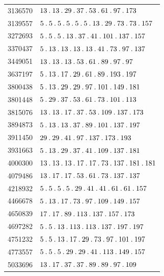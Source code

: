 \begin{longtable}{@{}r|l@{}}
3136570 & $13\pdot 13\pdot 29\pdot 37\pdot 53\pdot 61\pdot 97\pdot 173$\\
3139557 & $5\pdot 5\pdot 5\pdot 5\pdot 5\pdot 5\pdot 13\pdot 29\pdot 73\pdot 73\pdot 157$\\
3272693 & $5\pdot 5\pdot 5\pdot 13\pdot 37\pdot 41\pdot 101\pdot 137\pdot 157$\\
3370437 & $5\pdot 13\pdot 13\pdot 13\pdot 13\pdot 41\pdot 73\pdot 97\pdot 137$\\
3449051 & $13\pdot 13\pdot 13\pdot 53\pdot 61\pdot 89\pdot 97\pdot 97$\\
3637197 & $5\pdot 13\pdot 17\pdot 29\pdot 61\pdot 89\pdot 193\pdot 197$\\
3800438 & $5\pdot 13\pdot 29\pdot 29\pdot 97\pdot 101\pdot 149\pdot 181$\\
3801448 & $5\pdot 29\pdot 37\pdot 53\pdot 61\pdot 73\pdot 101\pdot 113$\\
3815076 & $13\pdot 13\pdot 17\pdot 37\pdot 53\pdot 109\pdot 137\pdot 173$\\
3894873 & $5\pdot 13\pdot 13\pdot 37\pdot 89\pdot 101\pdot 137\pdot 197$\\
3911450 & $29\pdot 29\pdot 41\pdot 97\pdot 137\pdot 173\pdot 193$\\
3931663 & $5\pdot 13\pdot 29\pdot 37\pdot 41\pdot 109\pdot 137\pdot 181$\\
4000300 & $13\pdot 13\pdot 13\pdot 17\pdot 17\pdot 73\pdot 137\pdot 181\pdot 181$\\
4079486 & $13\pdot 17\pdot 17\pdot 53\pdot 61\pdot 73\pdot 137\pdot 137$\\
4218932 & $5\pdot 5\pdot 5\pdot 5\pdot 29\pdot 41\pdot 41\pdot 61\pdot 61\pdot 157$\\
4466678 & $5\pdot 13\pdot 17\pdot 73\pdot 97\pdot 109\pdot 149\pdot 157$\\
4650839 & $17\pdot 17\pdot 89\pdot 113\pdot 137\pdot 157\pdot 173$\\
4697282 & $5\pdot 5\pdot 13\pdot 113\pdot 113\pdot 137\pdot 197\pdot 197$\\
4751232 & $5\pdot 5\pdot 13\pdot 17\pdot 29\pdot 73\pdot 97\pdot 101\pdot 197$\\
4773557 & $5\pdot 5\pdot 5\pdot 29\pdot 29\pdot 41\pdot 113\pdot 149\pdot 157$\\
5033696 & $13\pdot 17\pdot 37\pdot 37\pdot 89\pdot 89\pdot 97\pdot 109$\\
\end{longtable}\endgroup
